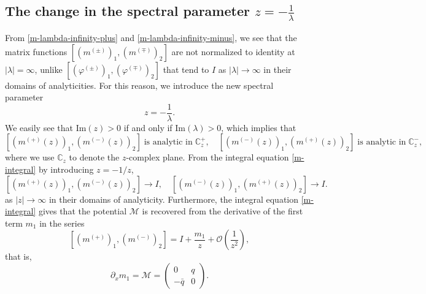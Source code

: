\documentclass[11pt]{article}
\newcommand{\CC}{{\mathbb C}}
\begin{document}
\subsection{The change in the spectral parameter $z=-\frac{1}{\lambda}$}
From \eqref{m-lambda-infinity-plus} and \eqref{m-lambda-infinity-minus}, we see that the matrix functions $[(m^{(\pm)})_1,(m^{(\mp)})_2]$ are not normalized to identity at $|\lambda|=\infty$, unlike $[(\varphi^{(\pm)})_1,(\varphi^{(\mp)})_2]$ that tend to $I$ as $|\lambda|\rightarrow \infty$ in their domains of analyticities. For this reason, we introduce the new spectral parameter 
$$z=-\frac{1}{\lambda}.$$ 
We easily see that $\mbox{Im}(z)>0$ if and only if $\mbox{Im}(\lambda)>0$, which implies that 
 $$[(m^{(+)}(z))_1, (m^{(-)}(z))_2] \;\mbox{is analytic in} \; \CC^+_z, \quad [(m^{(-)}(z))_1, (m^{(+)}(z))_2] \;\mbox{is analytic in} \; \CC^-_z,$$ 
where we use $\CC_z$ to denote the $z$-complex plane. From the integral equation \eqref{m-integral} by introducing $z=-1/z$,  
  \begin{equation}\label{asymptotic}
[(m^{(+)}(z))_1, (m^{(-)}(z))_2] \rightarrow I, \quad [(m^{(-)}(z))_1, (m^{(+)}(z))_2] \rightarrow I.
\end{equation}
 as $|z|\rightarrow \infty$ in their domains of analyticity. 
Furthermore, the integral equation \eqref{m-integral} gives that the potential $\mathcal{M}$ is recovered from the derivative of the first term $m_1$ in the series
\begin{equation}\label{asymptotic-2}
[(m^{(+)})_1, (m^{(-)})_2]=I+\frac{m_1}{z} + \mathcal{O}(\frac{1}{z^2}),
\end{equation}
that is,
\begin{equation}\label{potential-formula}
\partial_xm_1=\mathcal{M}=\begin{pmatrix} 0 & q\\ -\bar{q} & 0 \end{pmatrix}.
\end{equation}
\end{document}
